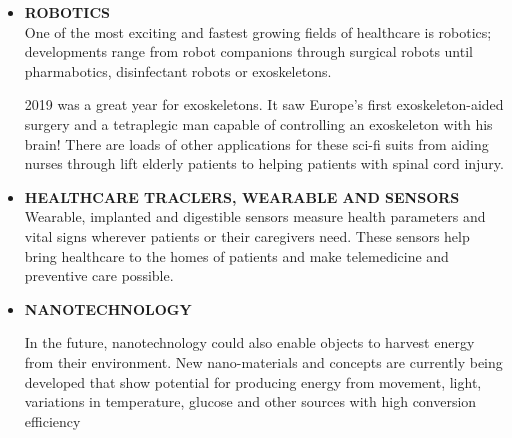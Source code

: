 \documentclass[12pt]{article}
\begin{document}
\begin{itemize}
\item\textbf{ROBOTICS}\\
One of the most exciting and fastest growing fields of healthcare is robotics; developments range from robot companions through surgical robots until pharmabotics, disinfectant robots or exoskeletons. 

2019 was a great year for exoskeletons. It saw Europe’s first exoskeleton-aided surgery and a tetraplegic man capable of controlling an exoskeleton with his brain! There are loads of other applications for these sci-fi suits from aiding nurses through lift elderly patients to helping patients with spinal cord injury.



\item\textbf{HEALTHCARE TRACLERS, WEARABLE AND SENSORS}\\
Wearable, implanted and digestible sensors measure health parameters and vital signs wherever patients or their caregivers need. These sensors help bring healthcare to the homes of patients and make telemedicine and preventive care possible.


\item\textbf{NANOTECHNOLOGY}

In the future, nanotechnology could also enable objects to harvest energy from their environment. New nano-materials and concepts are currently being developed that show potential for producing energy from movement, light, variations in temperature, glucose and other sources with high conversion efficiency



\end{itemize}
\end{document}
